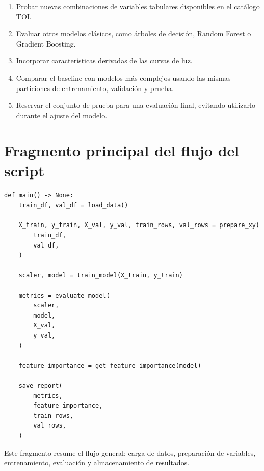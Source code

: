 \documentclass[12pt,letterpaper]{article}
\begin{document}
\begin{enumerate}
    \item Probar nuevas combinaciones de variables tabulares disponibles en el catálogo TOI.
    \item Evaluar otros modelos clásicos, como árboles de decisión, Random Forest o Gradient Boosting.
    \item Incorporar características derivadas de las curvas de luz.
    \item Comparar el baseline con modelos más complejos usando las mismas particiones de entrenamiento, validación y prueba.
    \item Reservar el conjunto de prueba para una evaluación final, evitando utilizarlo durante el ajuste del modelo.
\end{enumerate}

\appendix
\section{Fragmento principal del flujo del script}

\begin{lstlisting}[style=pythonstyle, caption={Flujo principal del script}]
def main() -> None:
    train_df, val_df = load_data()

    X_train, y_train, X_val, y_val, train_rows, val_rows = prepare_xy(
        train_df,
        val_df,
    )

    scaler, model = train_model(X_train, y_train)

    metrics = evaluate_model(
        scaler,
        model,
        X_val,
        y_val,
    )

    feature_importance = get_feature_importance(model)

    save_report(
        metrics,
        feature_importance,
        train_rows,
        val_rows,
    )
\end{lstlisting}

Este fragmento resume el flujo general: carga de datos, preparación de variables, entrenamiento, evaluación y almacenamiento de resultados.
\end{document}

